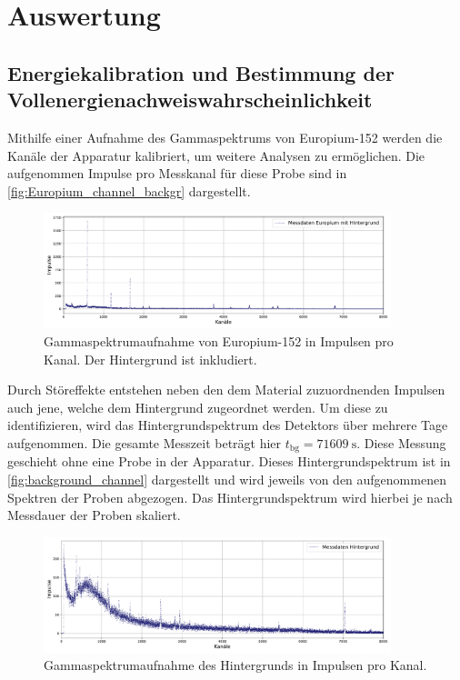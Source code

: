 \chapter{Auswertung}
\label{cha:Auswertung}

\section{Energiekalibration und Bestimmung der Vollenergienachweiswahrscheinlichkeit}

Mithilfe einer Aufnahme des Gammaspektrums von Europium-152 werden die Kanäle der Apparatur kalibriert, um weitere Analysen zu ermöglichen.
Die aufgenommen Impulse pro Messkanal für diese Probe sind in \autoref{fig:Europium_channel_backgr} dargestellt.

\begin{figure}
    \centering
    \includegraphics[width = 0.9\textwidth]{plots/europium_channel_backgr.pdf}
    \caption{Gammaspektrumaufnahme von Europium-152 in Impulsen pro Kanal. Der Hintergrund ist inkludiert.}
    \label{fig:Europium_channel_backgr}
\end{figure}

Durch Störeffekte entstehen neben den dem Material zuzuordnenden Impulsen auch jene, welche dem Hintergrund zugeordnet werden. Um diese zu identifizieren,
wird das Hintergrundspektrum des Detektors über mehrere Tage aufgenommen. Die gesamte Messzeit beträgt hier $t_{\mathrm{bg}} = \qty{71609}{\second}$. 
Diese Messung geschieht ohne eine Probe in der Apparatur. Dieses Hintergrundspektrum ist in \autoref{fig:background_channel}
dargestellt und wird jeweils von den aufgenommenen Spektren der Proben abgezogen. Das Hintergrundspektrum wird hierbei je nach Messdauer der Proben skaliert.

\begin{figure}
    \centering
    \includegraphics[width = 0.9\textwidth]{plots/background_channel.pdf}
    \caption{Gammaspektrumaufnahme des Hintergrunds in Impulsen pro Kanal.}
    \label{fig:background_channel}
\end{figure}

